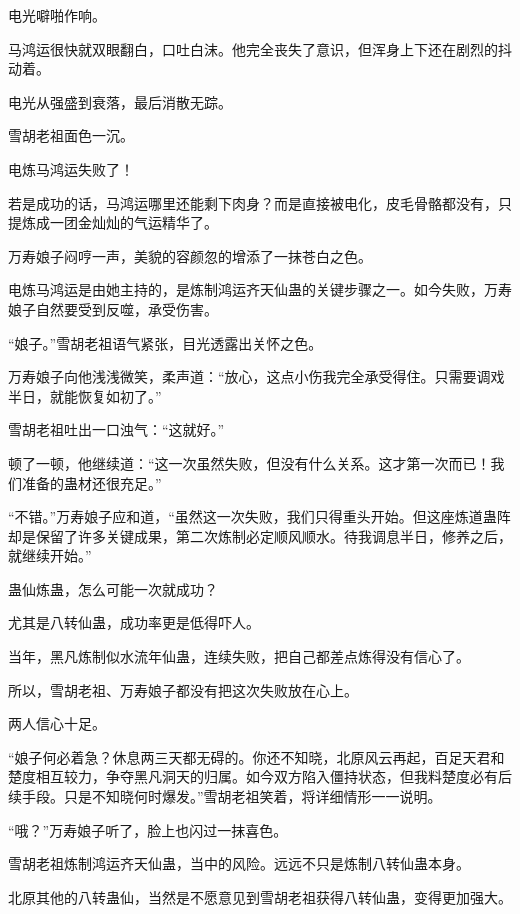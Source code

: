 
\begin{this_body}

电光噼啪作响。

马鸿运很快就双眼翻白，口吐白沫。他完全丧失了意识，但浑身上下还在剧烈的抖动着。

电光从强盛到衰落，最后消散无踪。

雪胡老祖面色一沉。

电炼马鸿运失败了！

若是成功的话，马鸿运哪里还能剩下肉身？而是直接被电化，皮毛骨骼都没有，只提炼成一团金灿灿的气运精华了。

万寿娘子闷哼一声，美貌的容颜忽的增添了一抹苍白之色。

电炼马鸿运是由她主持的，是炼制鸿运齐天仙蛊的关键步骤之一。如今失败，万寿娘子自然要受到反噬，承受伤害。

“娘子。”雪胡老祖语气紧张，目光透露出关怀之色。

万寿娘子向他浅浅微笑，柔声道：“放心，这点小伤我完全承受得住。只需要调戏半日，就能恢复如初了。”

雪胡老祖吐出一口浊气：“这就好。”

顿了一顿，他继续道：“这一次虽然失败，但没有什么关系。这才第一次而已！我们准备的蛊材还很充足。”

“不错。”万寿娘子应和道，“虽然这一次失败，我们只得重头开始。但这座炼道蛊阵却是保留了许多关键成果，第二次炼制必定顺风顺水。待我调息半日，修养之后，就继续开始。”

蛊仙炼蛊，怎么可能一次就成功？

尤其是八转仙蛊，成功率更是低得吓人。

当年，黑凡炼制似水流年仙蛊，连续失败，把自己都差点炼得没有信心了。

所以，雪胡老祖、万寿娘子都没有把这次失败放在心上。

两人信心十足。

“娘子何必着急？休息两三天都无碍的。你还不知晓，北原风云再起，百足天君和楚度相互较力，争夺黑凡洞天的归属。如今双方陷入僵持状态，但我料楚度必有后续手段。只是不知晓何时爆发。”雪胡老祖笑着，将详细情形一一说明。

“哦？”万寿娘子听了，脸上也闪过一抹喜色。

雪胡老祖炼制鸿运齐天仙蛊，当中的风险。远远不只是炼制八转仙蛊本身。

北原其他的八转蛊仙，当然是不愿意见到雪胡老祖获得八转仙蛊，变得更加强大。


\end{this_body}
